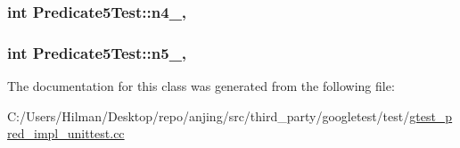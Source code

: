 \subsubsection[{n4\+\_\+}]{\setlength{\rightskip}{0pt plus 5cm}int Predicate5\+Test\+::n4\+\_\+\hspace{0.3cm}{\ttfamily [static]}, {\ttfamily [protected]}}\label{class_predicate5_test_a5d66aa58badddc8d3d8070a93c0558d6}
\hypertarget{class_predicate5_test_a96badba6366235a2771b27ea014bd9ce}{}
\subsubsection[{n5\+\_\+}]{\setlength{\rightskip}{0pt plus 5cm}int Predicate5\+Test\+::n5\+\_\+\hspace{0.3cm}{\ttfamily [static]}, {\ttfamily [protected]}}\label{class_predicate5_test_a96badba6366235a2771b27ea014bd9ce}


The documentation for this class was generated from the following file\+:\begin{DoxyCompactItemize}
\item 
C\+:/\+Users/\+Hilman/\+Desktop/repo/anjing/src/third\+\_\+party/googletest/test/\hyperlink{gtest__pred__impl__unittest_8cc}{gtest\+\_\+pred\+\_\+impl\+\_\+unittest.\+cc}\end{DoxyCompactItemize}
